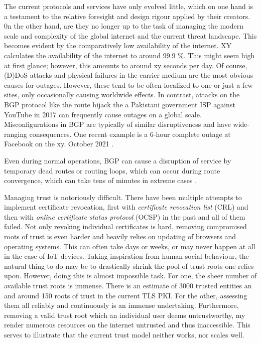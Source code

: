 \documentclass[../eva1_scion.tex]{subfiles}
\begin{document}
    The current protocols and services have only evolved little, which on one hand is a testament to the relative foresight and design rigour applied by their creators. 0n the other hand, are they no longer up to the task of managing the modern scale and complexity of the global internet and the current threat landscape. This becomes evident by the comparatively low availability of the internet. XY calculates the availability of the internet to around 99.9 \%. This might seem high at first glance; however, this amounts to around xy seconds per day. Of course, (D)DoS attacks and physical failures in the carrier medium are the most obvious causes for outages. However, these tend to be often localized to one or just a few sites, only occasionally causing worldwide effects. In contrast, attacks on the BGP protocol like the route hijack the a Pakistani government ISP against YouTube in 2017 \cite{youtube_hijack} can frequently cause outages on a global scale. Misconfigurations in BGP are typically of similar disruptiveness and have wide-ranging consequences. One recent example is a 6-hour complete outage at Facebook on the xy. October 2021 \cite{facebook_oups}.

    Even during normal operations, BGP can cause a disruption of service by temporary dead routes or routing loops, which can occur during route convergence, which can take tens of minutes in extreme cases \cite{route_convergence}.

    Managing trust is notoriously difficult. There have been multiple attempts to implement certificate revocation, first with \textit{certificate revocation list} (CRL) \cite{rfc_crl} and then with \textit{online certificate status protocol} (OCSP) \cite{rfc_ocsp} in the past and all of them failed. Not only revoking individual certificates is hard, removing compromised roots of trust is even harder and heavily relies on updating of browsers and operating systems. This can often take days or weeks, or may never happen at all in the case of IoT devices. Taking inspiration from human social behaviour, the natural thing to do may be to  drastically shrink the pool of trust roots one relies upon. However, doing this is almost impossible task. For one, the sheer number of available trust roots is immense. There is an estimate of 3000 \cite{trusted_entities} trusted entities an and around 150 roots of trust in the current TLS PKI. For the other, assessing them all reliably and continuously is an immense undertaking. Furthermore, removing a valid trust root which an individual user deems untrustworthy, my render numerous resources on the internet untrusted and thus inaccessible. This serves to illustrate that the current trust model neither works, nor  scales well.
\end{document}
